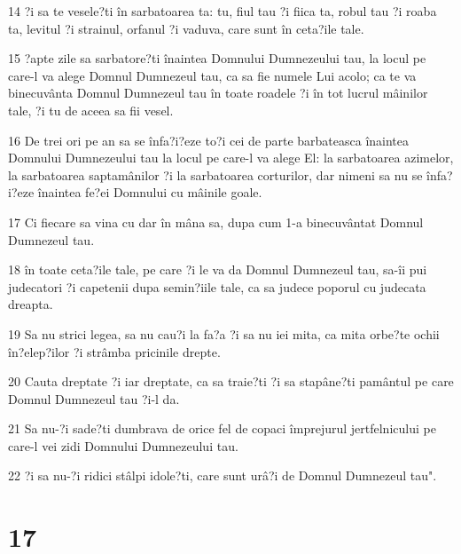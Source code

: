 \par 14 ?i sa te vesele?ti în sarbatoarea ta: tu, fiul tau ?i fiica ta, robul tau ?i roaba ta, levitul ?i strainul, orfanul ?i vaduva, care sunt în ceta?ile tale.
\par 15 ?apte zile sa sarbatore?ti înaintea Domnului Dumnezeului tau, la locul pe care-l va alege Domnul Dumnezeul tau, ca sa fie numele Lui acolo; ca te va binecuvânta Domnul Dumnezeul tau în toate roadele ?i în tot lucrul mâinilor tale, ?i tu de aceea sa fii vesel.
\par 16 De trei ori pe an sa se înfa?i?eze to?i cei de parte barbateasca înaintea Domnului Dumnezeului tau la locul pe care-l va alege El: la sarbatoarea azimelor, la sarbatoarea saptamânilor ?i la sarbatoarea corturilor, dar nimeni sa nu se înfa?i?eze înaintea fe?ei Domnului cu mâinile goale.
\par 17 Ci fiecare sa vina cu dar în mâna sa, dupa cum 1-a binecuvântat Domnul Dumnezeul tau.
\par 18 în toate ceta?ile tale, pe care ?i le va da Domnul Dumnezeul tau, sa-îi pui judecatori ?i capetenii dupa semin?iile tale, ca sa judece poporul cu judecata dreapta.
\par 19 Sa nu strici legea, sa nu cau?i la fa?a ?i sa nu iei mita, ca mita orbe?te ochii în?elep?ilor ?i strâmba pricinile drepte.
\par 20 Cauta dreptate ?i iar dreptate, ca sa traie?ti ?i sa stapâne?ti pamântul pe care Domnul Dumnezeul tau ?i-l da.
\par 21 Sa nu-?i sade?ti dumbrava de orice fel de copaci împrejurul jertfelnicului pe care-l vei zidi Domnului Dumnezeului tau.
\par 22 ?i sa nu-?i ridici stâlpi idole?ti, care sunt urâ?i de Domnul Dumnezeul tau".

\chapter{17}

